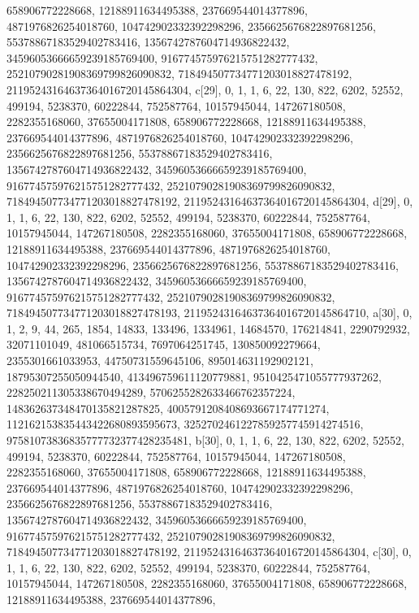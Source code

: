 {{{   658906772228668, 12188911634495388, 237669544014377896, 
   4871976826254018760, 104742902332392298296, 2356625676822897681256, 
   55378867183529402783416, 1356742787604714936822432, 
   34596053666659239185769400, 916774575976215751282777432, 
   25210790281908369799826090832, 718494507734771203018827478192, 
   21195243164637364016720145864304}}, 
 {c[29], {0, 1, 1, 6, 22, 130, 822, 6202, 52552, 499194, 5238370, 60222844, 
   752587764, 10157945044, 147267180508, 2282355168060, 37655004171808, 
   658906772228668, 12188911634495388, 237669544014377896, 
   4871976826254018760, 104742902332392298296, 2356625676822897681256, 
   55378867183529402783416, 1356742787604714936822432, 
   34596053666659239185769400, 916774575976215751282777432, 
   25210790281908369799826090832, 718494507734771203018827478192, 
   21195243164637364016720145864304}}, 
 {d[29], {0, 1, 1, 6, 22, 130, 822, 6202, 52552, 499194, 5238370, 60222844, 
   752587764, 10157945044, 147267180508, 2282355168060, 37655004171808, 
   658906772228668, 12188911634495388, 237669544014377896, 
   4871976826254018760, 104742902332392298296, 2356625676822897681256, 
   55378867183529402783416, 1356742787604714936822432, 
   34596053666659239185769400, 916774575976215751282777432, 
   25210790281908369799826090832, 718494507734771203018827478193, 
   21195243164637364016720145864710}}, 
 {a[30], {0, 1, 2, 9, 44, 265, 1854, 14833, 133496, 1334961, 14684570, 
   176214841, 2290792932, 32071101049, 481066515734, 7697064251745, 
   130850092279664, 2355301661033953, 44750731559645106, 895014631192902121, 
   18795307255050944540, 413496759611120779881, 9510425471055777937262, 
   228250211305338670494289, 5706255282633466762357224, 
   148362637348470135821287825, 4005791208408693667174771274, 
   112162153835443422680893595673, 3252702461227859257745914274516, 
   97581073836835777732377428235481}}, 
 {b[30], {0, 1, 1, 6, 22, 130, 822, 6202, 52552, 499194, 5238370, 60222844, 
   752587764, 10157945044, 147267180508, 2282355168060, 37655004171808, 
   658906772228668, 12188911634495388, 237669544014377896, 
   4871976826254018760, 104742902332392298296, 2356625676822897681256, 
   55378867183529402783416, 1356742787604714936822432, 
   34596053666659239185769400, 916774575976215751282777432, 
   25210790281908369799826090832, 718494507734771203018827478192, 
   21195243164637364016720145864304}}, 
 {c[30], {0, 1, 1, 6, 22, 130, 822, 6202, 52552, 499194, 5238370, 60222844, 
   752587764, 10157945044, 147267180508, 2282355168060, 37655004171808, 
   658906772228668, 12188911634495388, 237669544014377896, 
}}}
